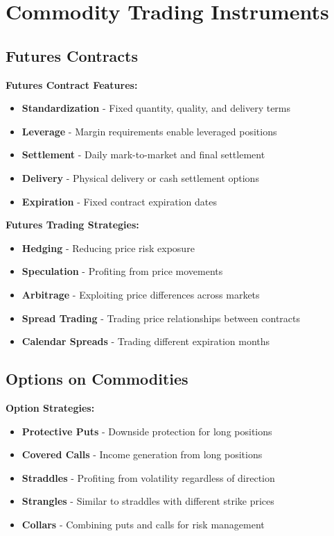 \documentclass[12pt]{article}
\begin{document}
\section{Commodity Trading Instruments}

\subsection{Futures Contracts}

\textbf{Futures Contract Features:}
\begin{itemize}
    \item \textbf{Standardization} - Fixed quantity, quality, and delivery terms
    \item \textbf{Leverage} - Margin requirements enable leveraged positions
    \item \textbf{Settlement} - Daily mark-to-market and final settlement
    \item \textbf{Delivery} - Physical delivery or cash settlement options
    \item \textbf{Expiration} - Fixed contract expiration dates
\end{itemize}

\textbf{Futures Trading Strategies:}
\begin{itemize}
    \item \textbf{Hedging} - Reducing price risk exposure
    \item \textbf{Speculation} - Profiting from price movements
    \item \textbf{Arbitrage} - Exploiting price differences across markets
    \item \textbf{Spread Trading} - Trading price relationships between contracts
    \item \textbf{Calendar Spreads} - Trading different expiration months
\end{itemize}

\subsection{Options on Commodities}

\textbf{Option Strategies:}
\begin{itemize}
    \item \textbf{Protective Puts} - Downside protection for long positions
    \item \textbf{Covered Calls} - Income generation from long positions
    \item \textbf{Straddles} - Profiting from volatility regardless of direction
    \item \textbf{Strangles} - Similar to straddles with different strike prices
    \item \textbf{Collars} - Combining puts and calls for risk management
\end{itemize}
\end{document}
